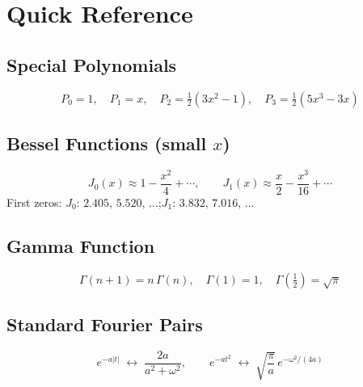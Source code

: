 \documentclass[11pt, letterpaper]{article}
\theoremstyle{plain}
\begin{document}
\newpage
\appendix
\section{Quick Reference}

\subsection*{Special Polynomials}
\[
  P_0 = 1,\quad P_1 = x,\quad P_2 = \tfrac{1}{2}(3x^2-1),\quad
  P_3 = \tfrac{1}{2}(5x^3-3x)
\]

\subsection*{Bessel Functions (small $x$)}
\[
  J_0(x) \approx 1 - \frac{x^2}{4} + \cdots, \qquad
  J_1(x) \approx \frac{x}{2} - \frac{x^3}{16} + \cdots
\]
First zeros: $J_0$: $2.405,\,5.520,\,\ldots$;\quad $J_1$: $3.832,\,7.016,\,\ldots$

\subsection*{Gamma Function}
\[
  \Gamma(n+1) = n\,\Gamma(n), \quad \Gamma(1)=1, \quad \Gamma\!\left(\tfrac{1}{2}\right)=\sqrt{\pi}
\]

\subsection*{Standard Fourier Pairs}
\[
  e^{-a|t|} \;\longleftrightarrow\; \frac{2a}{a^2+\omega^2}, \qquad
  e^{-at^2} \;\longleftrightarrow\; \sqrt{\frac{\pi}{a}}\,e^{-\omega^2/(4a)}
\]
\end{document}

